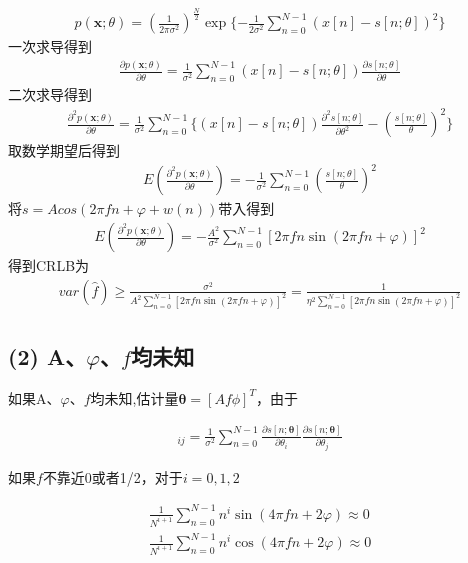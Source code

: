 \documentclass[fontset=windows]{article}
\numberwithin{figure}{section}
\begin{document}
\begin{align*}
	p(\mathbf{x};\theta)=(\frac{1}{2\pi \sigma^2})^{\frac{N}{2}}
	\exp\{ -\frac{1}{2\sigma^2}\sum_{n=0}^{N-1}(x[n]-s[n;\theta])^2 \}
\end{align*}
一次求导得到
\begin{align*}
	\frac{\partial p(\mathbf{x};\theta)}{\partial \theta}=
	\frac{1}{\sigma^2}\sum_{n=0}^{N-1}(x[n]-s[n;\theta])\frac{\partial s[n;\theta]}{\partial\theta}
\end{align*}
二次求导得到
\begin{align*}
	\frac{\partial^2 p(\mathbf{x};\theta)}{\partial \theta}=
	\frac{1}{\sigma^2}\sum_{n=0}^{N-1}\{(x[n]-s[n;\theta])
	\frac{\partial^2 s[n;\theta]}{\partial\theta^2}
	-\left(\frac{s[n;\theta]}{\theta}\right)^2\}
\end{align*}
取数学期望后得到
\begin{align*}
	E\left(\frac{\partial^2 p(\mathbf{x};\theta)}{\partial \theta}\right)=
	-\frac{1}{\sigma^2}\sum_{n=0}^{N-1}
	\left(\frac{s[n;\theta]}{\theta}\right)^2
\end{align*}
将\(s=Acos(2\pi f n +\varphi + w(n))\)带入得到
\begin{align*}
	E\left(\frac{\partial^2 p(\mathbf{x};\theta)}{\partial \theta}\right)=
	-\frac{A^2}{\sigma^2}\sum_{n=0}^{N-1}
	\left[2\pi f n \sin(2\pi f n+\varphi)\right]^2
\end{align*}
得到CRLB为
\begin{align*}
	var(\hat{f})
	\geq \frac{\sigma^2}{A^2 \sum_{n=0}^{N-1}
		\left[2\pi f n \sin(2\pi f n+\varphi)\right]^2}
	=	\frac{1}{\eta ^2 \sum_{n=0}^{N-1}
		\left[2\pi f n \sin(2\pi f n+\varphi)\right]^2}
\end{align*}

\subsection*{(2) A、\(\varphi\)、\(f\)均未知}
如果A、\(\varphi\)、\(f\)均未知,估计量\(\boldsymbol{\theta}=[Af\phi]^T\)，由于

\begin{align*}
	[\mathbf{I}(\boldsymbol{\theta})]_{ij}=\frac{1}{\sigma^2}\sum_{n=0}^{N-1}
	\frac{\partial s[n;\boldsymbol{\theta}]}{\partial \theta_i}
	\frac{\partial s[n;\boldsymbol{\theta}]}{\partial \theta_j}
\end{align*}

如果\(f\)不靠近0或者1/2，对于\(i=0,1,2\)

\begin{align*}
	\frac{1}{N^{i+1}}\sum_{n=0}^{N-1}n^i\sin(4\pi f n+2\varphi)\approx 0 \\
	\frac{1}{N^{i+1}}\sum_{n=0}^{N-1}n^i\cos(4\pi f n+2\varphi)\approx 0
\end{align*}
\end{document}
